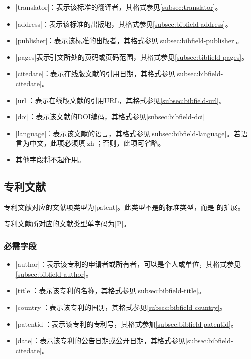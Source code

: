 \begin{itemize}
\item |translator|：表示该标准的翻译者，其格式参见\ref{subsec:translator}。
\item |address|：表示该标准的出版地，其格式参见\ref{subsec:bibfield-address}。
\item |publisher|：表示该标准的出版者，其格式参见\ref{subsec:bibfield-publisher}。
\item |pages|表示引文所处的页码或页码范围，其格式参见\ref{subsec:bibfield-pages}。
\item |citedate|：表示在线版文献的引用日期，其格式参见\ref{subsec:bibfield-citedate}。
\item |url|：表示在线版文献的引用URL，其格式参见\ref{subsec:bibfield-url}。
\item |doi|：表示该文献的DOI编码，其格式参见\ref{subsec:bibfield-doi}
\item |language|：表示该文献的语言，其格式参见\ref{subsec:bibfield-language}。若语
  言为中文，此项必须填|zh|；否则，此项可省略。
\item 其他字段将不起作用。
\end{itemize}

\subsection{专利文献}\label{subsec:bibtype-patent}

专利文献对应的{\BibTeX}文献项类型为|patent|。此类型不是{\BibTeX}的标准类型，而是
{\njuthesis}的扩展。

专利文献所对应的文献类型\cite{gbt3469-1983}单字码为|P|。

\subsubsection{必需字段}

\begin{itemize}
\item |author|：表示该专利的申请者或所有者，可以是个人或单位，其格式参见
  \ref{subsec:bibfield-author}。
\item |title|：表示该专利的名称，其格式参见\ref{subsec:bibfield-title}。
\item |country|：表示该专利的国别，其格式参见\ref{subsec:bibfield-country}。
\item |patentid|：表示该专利的专利号，其格式参加\ref{subsec:bibfield-patentid}。
\item |date|：表示该专利的公告日期或公开日期，其格式参见\ref{subsec:bibfield-citedate}。
\end{itemize}

